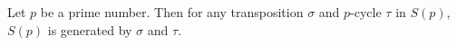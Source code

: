 Let $p$ be a prime number. Then for any transposition $\sigma$ and $p$-cycle $\tau$ in $S(p)$, $S(p)$ is generated by $\sigma$ and $\tau$.
